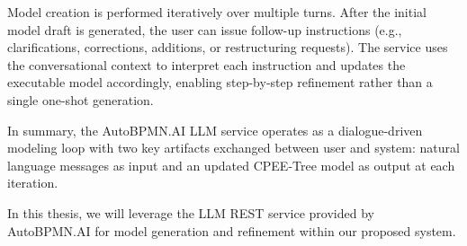 Model creation is performed iteratively over multiple turns. After the initial model draft is generated, the user can issue follow-up instructions (e.g., clarifications, corrections, additions, or restructuring requests). The service uses the conversational context to interpret each instruction and updates the executable model accordingly, enabling step-by-step refinement rather than a single one-shot generation.

In summary, the AutoBPMN.AI LLM service operates as a dialogue-driven modeling loop with two key artifacts exchanged between user and system: natural language messages as input and an updated CPEE-Tree model as output at each iteration.

In this thesis, we will leverage the LLM REST service provided by AutoBPMN.AI for model generation and refinement within our proposed system.